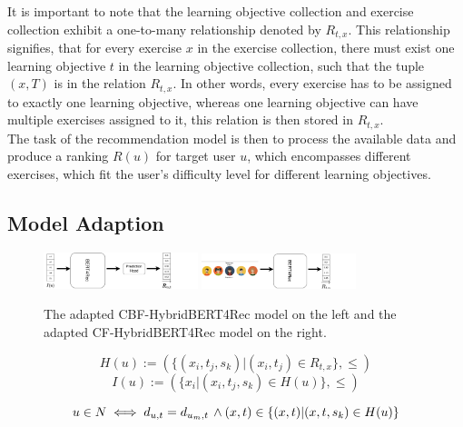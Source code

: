 \documentclass{Academic}
\begin{document}
        It is important to note that the learning objective collection and exercise collection exhibit a one-to-many relationship denoted by $R_{t,x}$. This relationship signifies, that for every exercise $x$ in the exercise collection, there must exist one learning objective $t$ in the learning objective collection, such that the tuple $(x,T)$ is in the relation $R_{t,x}$. In other words, every exercise has to be assigned to exactly one learning objective, whereas one learning objective can have multiple exercises assigned to it, this relation is then stored in $R_{t,x}$.\\
        The task of the recommendation model is then to process the available data and produce a ranking $R(u)$ for target user $u$, which encompasses different exercises, which fit the user's difficulty level for different learning objectives.
        

        \FloatBarrier
        \subsection{Model Adaption}
        \begin{figure}[ht!]
            \centering
            \includegraphics[width=0.4\textwidth]{images/cbf.pdf}
            \includegraphics[width=0.4\textwidth]{images/CF_use_case.pdf}
            \caption{The adapted CBF-HybridBERT4Rec model on the left and the adapted CF-HybridBERT4Rec model on the right.}
            \label{fig:modelAdapt}
        \end{figure}

        \begin{equation}
            H(u) := (\{(x_i, t_j, s_k)| (x_i, t_j) \in R_{t,x}\}, \leq)
        \end{equation}
        \begin{equation}
            I(u) := (\{x_i|(x_i, t_j, s_k) \in H(u)\}, \leq)
        \end{equation}

        \begin{equation}
            u \in N \iff d_{u, t} = d_{u_m, t} \text{\,} \wedge (x, t) \in \{(x,t)|(x,t,s_k) \in H(u)\}
        \end{equation}
\end{document}
